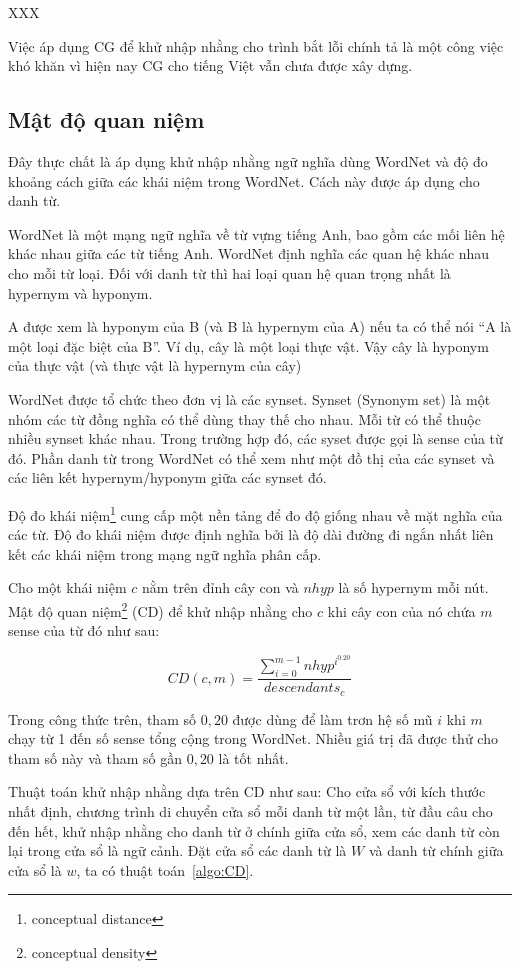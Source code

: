 \documentclass[a4paper,oneside,14pt]{extbook} %
\begin{document}
XXX %


Việc áp dụng CG để khử nhập nhằng cho trình bắt lỗi chính tả là một
công việc khó khăn vì hiện nay CG cho tiếng Việt vẫn chưa được xây
dựng. 

\subsection{Mật độ quan niệm}


Đây thực chất là áp dụng khử nhập nhằng ngữ nghĩa dùng
WordNet và độ đo khoảng cách giữa các khái niệm trong WordNet. Cách
này được áp dụng cho danh từ. 

WordNet là một mạng ngữ nghĩa về từ vựng tiếng Anh, bao gồm các mối
liên hệ khác nhau giữa các từ tiếng Anh. WordNet định nghĩa các quan
hệ khác nhau cho mỗi từ loại. Đối với danh từ thì hai loại quan hệ
quan trọng nhất là hypernym và hyponym. 

A được xem là hyponym của B
(và B là hypernym của A) nếu ta có thể nói ``A là một loại đặc biệt
của B''. Ví dụ, cây là một loại thực vật. Vậy cây là hyponym của thực
vật (và thực vật là hypernym của cây)

WordNet được tổ chức theo đơn vị là các synset. Synset
(Synonym set) là một nhóm các từ đồng nghĩa có thể dùng thay thế cho
nhau. Mỗi từ có thể thuộc nhiều synset khác nhau. Trong trường hợp đó,
các syset được gọi là sense của từ đó. Phần danh từ trong WordNet có
thể xem như một đồ thị của các synset và các liên kết hypernym/hyponym
giữa các synset đó.  

Độ đo khái niệm\footnote{conceptual distance} cung cấp một nền tảng để
đo độ giống nhau về mặt nghĩa của các từ. Độ đo khái niệm được định
nghĩa bởi \cite{Rada} là độ dài đường đi ngắn nhất liên kết các khái
niệm trong mạng ngữ nghĩa phân cấp.

Cho một khái niệm $c$ nằm trên đỉnh cây con và $nhyp$ là số hypernym
mỗi nút. Mật độ quan niệm\footnote{conceptual density} (CD) để khử nhập nhằng cho $c$ khi cây con của
nó chứa $m$ sense của từ đó  như sau:

$$CD(c,m)=\frac{\displaystyle\sum^{m-1}_{i=0}nhyp^{i^{0.20}}}{descendants_c}$$

Trong công thức trên, tham số $0,20$ được dùng để làm trơn hệ số mũ
$i$ khi $m$ chạy từ 1 đến số sense tổng cộng trong WordNet. Nhiều giá
trị đã được thử cho tham số này và tham số gần $0,20$ là tốt nhất.


Thuật toán khử nhập nhằng dựa trên CD như sau: Cho cửa sổ với kích
thước nhất định, chương trình di chuyển cửa sổ mỗi 
danh từ một lần, từ đầu câu cho đến hết, khử nhập nhằng cho danh từ ở
chính giữa cửa sổ, xem các danh từ còn lại trong cửa sổ là ngữ
cảnh. Đặt cửa sổ các danh từ là $W$ và danh từ chính giữa cửa sổ là
$w$, ta có thuật toán~\ref{algo:CD}.
\end{document}
